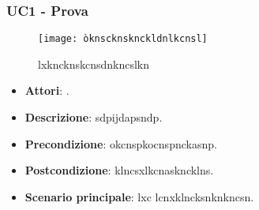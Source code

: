 \subsubsection{UC1 - Prova} 
\label{sssec:UC1} 
\begin{figure}[h!] 
\centering 
\texttt{[image: òknscknsknckldnlkcnsl]} 
\caption{lxkncknskcnsdnkncslkn} 
 \end{figure} 
\begin{itemize} 
\item \textbf{Attori}: .
\item \textbf{Descrizione}: sdpijdapsndp.
\item \textbf{Precondizione}: okcnspkocnspnckasnp.
\item \textbf{Postcondizione}: klncsxlkcnaskncklns.
\item \textbf{Scenario principale}: lxc lcnxklncksnknkncsn.\end{itemize} 

